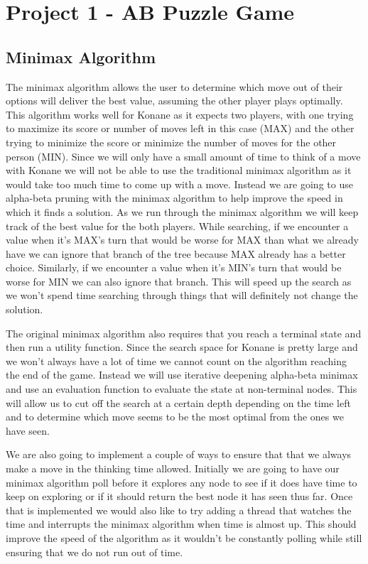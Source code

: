 \documentclass[12pt]{article}
\begin{document}
\section*{Project 1 - AB Puzzle Game}

\subsection*{Minimax Algorithm}
\quad The minimax algorithm allows the user to determine which move out of their options will deliver the best value, assuming the other player plays optimally.
This algorithm works well for Konane as it expects two players, with one trying to maximize its score or number of moves left in this case (MAX) and the other trying to minimize the score or minimize the number of moves for the other person (MIN).
Since we will only have a small amount of time to think of a move with Konane we will not be able to use the traditional minimax algorithm as it would take too much time to come up with a move.
Instead we are going to use alpha-beta pruning with the minimax algorithm to help improve the speed in which it finds a solution.
As we run through the minimax algorithm we will keep track of the best value for the both players.
While searching, if we encounter a value when it's MAX's turn that would be worse for MAX than what we already have we can ignore that branch of the tree because MAX already has a better choice.
Similarly, if we encounter a value when it's MIN's turn that would be worse for MIN we can also ignore that branch.
This will speed up the search as we won't spend time searching through things that will definitely not change the solution.

\smallskip The original minimax algorithm also requires that you reach a terminal state and then run a utility function.
Since the search space for Konane is pretty large and we won't always have a lot of time we cannot count on the algorithm reaching the end of the game.
Instead we will use iterative deepening alpha-beta minimax and use an evaluation function to evaluate the state at non-terminal nodes.
This will allow us to cut off the search at a certain depth depending on the time left and to determine which move seems to be the most optimal from the ones we have seen.

\smallskip We are also going to implement a couple of ways to ensure that that we always make a move in the thinking time allowed.
Initially we are going to have our minimax algorithm poll before it explores any node to see if it does have time to keep on exploring or if it should return the best node it has seen thus far.
Once that is implemented we would also like to try adding a thread that watches the time and interrupts the minimax algorithm when time is almost up.
This should improve the speed of the algorithm as it wouldn't be constantly polling while still ensuring that we do not run out of time.
\end{document}
